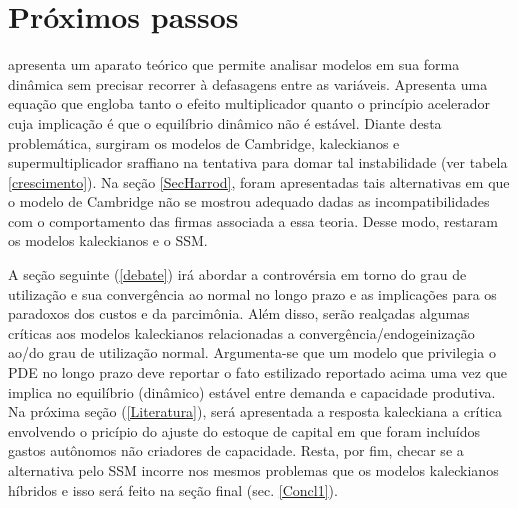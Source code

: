 \section*{Próximos passos}


\textcite{harrod_essay_1939} apresenta um aparato teórico que permite analisar modelos em sua forma dinâmica sem precisar recorrer à defasagens entre as variáveis. Apresenta uma equação que engloba tanto o efeito multiplicador quanto o princípio acelerador cuja implicação é que o equilíbrio dinâmico não é estável. Diante desta problemática, surgiram os modelos de Cambridge, kaleckianos e supermultiplicador sraffiano na tentativa para domar tal instabilidade (ver tabela \ref{crescimento}). Na seção \ref{SecHarrod}, foram apresentadas tais alternativas em que o modelo de Cambridge não se mostrou adequado dadas as incompatibilidades com o comportamento das firmas associada a essa teoria. Desse modo, restaram os modelos kaleckianos e o SSM. 

A seção seguinte (\ref{debate}) irá abordar a controvérsia em torno do grau de utilização e sua convergência ao normal no longo prazo e as implicações para os paradoxos dos custos e da parcimônia. Além disso, serão realçadas algumas críticas aos modelos kaleckianos relacionadas a convergência/endogeinização ao/do grau de utilização normal. Argumenta-se que um modelo que privilegia o PDE no longo prazo deve reportar o fato estilizado reportado acima uma vez que implica no equilíbrio (dinâmico) estável entre demanda e capacidade produtiva. Na próxima seção (\ref{Literatura}), será apresentada a resposta kaleckiana a crítica envolvendo o pricípio do ajuste do estoque de capital em que foram incluídos gastos autônomos não criadores de capacidade. Resta, por fim, checar se a alternativa pelo SSM incorre nos mesmos problemas que os modelos kaleckianos híbridos e isso será feito na seção final (sec. \ref{Concl1}).


